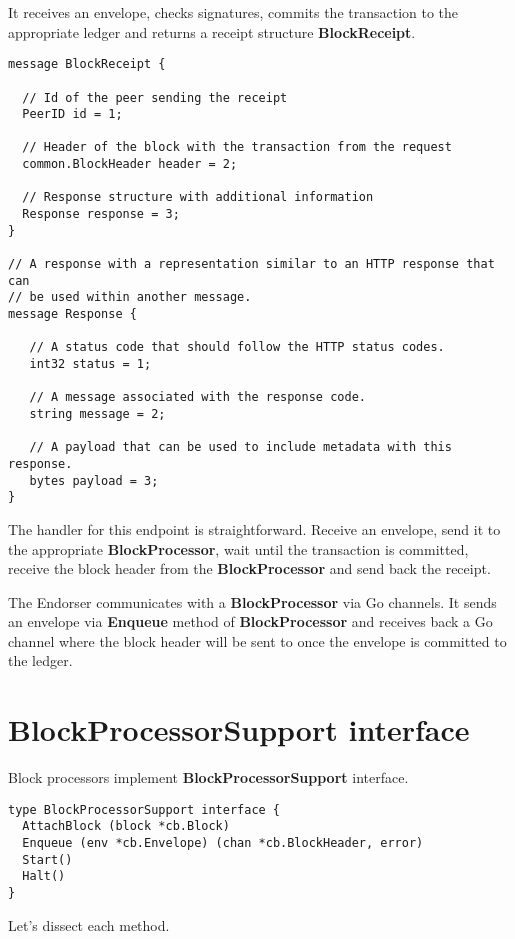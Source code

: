 It receives an envelope, checks signatures, commits the transaction to the appropriate ledger and returns a receipt structure \textbf{BlockReceipt}.

\begin{lstlisting}
message BlockReceipt {

  // Id of the peer sending the receipt
  PeerID id = 1;

  // Header of the block with the transaction from the request
  common.BlockHeader header = 2;

  // Response structure with additional information
  Response response = 3;
}

// A response with a representation similar to an HTTP response that can
// be used within another message.
message Response {

   // A status code that should follow the HTTP status codes.
   int32 status = 1;

   // A message associated with the response code.
   string message = 2;

   // A payload that can be used to include metadata with this response.
   bytes payload = 3;
}
\end{lstlisting}

The handler for this endpoint is straightforward. Receive an envelope, send it to the appropriate \textbf{BlockProcessor}, wait until the transaction is committed, receive the block header from the \textbf{BlockProcessor} and send back the receipt.

The Endorser communicates with a \textbf{BlockProcessor} via Go channels.
It sends an envelope via \textbf{Enqueue} method of \textbf{BlockProcessor} and receives back a Go channel where the block header will be sent to once the envelope is committed to the ledger.

\section{BlockProcessorSupport interface}
\label{sec:bp-interface}

Block processors implement \textbf{BlockProcessorSupport} interface.

\begin{lstlisting}
type BlockProcessorSupport interface {
  AttachBlock (block *cb.Block)
  Enqueue (env *cb.Envelope) (chan *cb.BlockHeader, error)
  Start()
  Halt()
}
\end{lstlisting}

Let's dissect each method.

